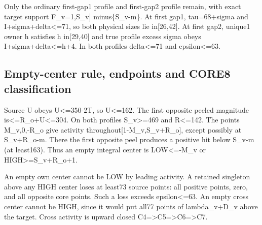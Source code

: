 \documentclass[10pt,a4paper]{article}
\theoremstyle{definition}
\begin{document}
Only the ordinary first-gap1 profile and first-gap2 profile remain,\allowbreak{} with
exact target support F\_\allowbreak{}v=\allowbreak{}{[}1,\allowbreak{}S\_\allowbreak{}v{]} minus\{S\_\allowbreak{}v-m\}. At first gap1,\allowbreak{}
tau=\allowbreak{}68+\allowbreak{}sigma and I+\allowbreak{}sigma+\allowbreak{}delta\textless=\allowbreak{}71,\allowbreak{} so both physical sizes lie
in{[}26,\allowbreak{}42{]}. At first gap2,\allowbreak{} unique1 owner h satisfies h in{[}29,\allowbreak{}40{]}
and true profile excess sigma obeys I+\allowbreak{}sigma+\allowbreak{}delta\textless=\allowbreak{}h+\allowbreak{}4. In both
profiles delta\textless=\allowbreak{}71 and epsilon\textless=\allowbreak{}63.

\hypertarget{empty-center-rule-endpoints-and-core8-classification}{%
\subsection{Empty-center rule,\allowbreak{} endpoints and CORE8
classification}\label{empty-center-rule-endpoints-and-core8-classification}}

Source U obeys U\textless=\allowbreak{}350-2T,\allowbreak{} so U\textless=\allowbreak{}162. The first opposite
peeled magnitude is\textless=\allowbreak{}R\_\allowbreak{}o+\allowbreak{}U\textless=\allowbreak{}304. On both profiles
S\_\allowbreak{}v\textgreater=\allowbreak{}469 and R\textless=\allowbreak{}142. The points M\_\allowbreak{}v,\allowbreak{}0,\allowbreak{}-R\_\allowbreak{}o give
activity throughout{[}1-M\_\allowbreak{}v,\allowbreak{}S\_\allowbreak{}v+\allowbreak{}R\_\allowbreak{}o{]},\allowbreak{} except possibly at
S\_\allowbreak{}v+\allowbreak{}R\_\allowbreak{}o-m. There the first opposite peel produces a positive hit below
S\_\allowbreak{}v-m (at least163). Thus an empty integral center is
LOW\textless=\allowbreak{}-M\_\allowbreak{}v or HIGH\textgreater=\allowbreak{}S\_\allowbreak{}v+\allowbreak{}R\_\allowbreak{}o+\allowbreak{}1.

An empty own center cannot be LOW by leading activity. A retained
singleton above any HIGH center loses at least73 source points: all
positive points,\allowbreak{} zero,\allowbreak{} and all opposite core points. Such a loss exceeds
epsilon\textless=\allowbreak{}63. An empty cross center cannot be HIGH,\allowbreak{} since it
would put all77 points of lambda\_\allowbreak{}v+\allowbreak{}D\_\allowbreak{}v above the target. Cross
activity is upward closed
C4=\allowbreak{}\textgreater C5=\allowbreak{}\textgreater C6=\allowbreak{}\textgreater C7.
\end{document}
